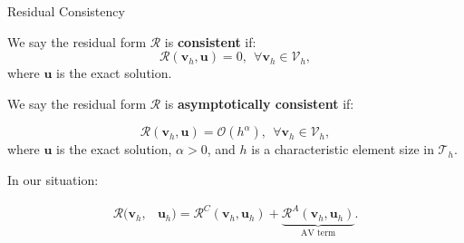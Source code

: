 \documentclass{beamer}
\newcounter{sectionframecount}
\begin{document}
\begin{frame}[t]{Residual Consistency}
\vspace{-10pt}
  \begin{itemize}
    \item We say the residual form $\mathcal{R}$ is \textbf{consistent} if:
    \begin{equation}
      \mathcal{R}(\boldsymbol{v}_h,\boldsymbol{u}) = 0,~~\forall \boldsymbol{v}_h \in \mathcal{V}_h,
    \end{equation}
    where $\boldsymbol{u}$ is the exact solution.

    {
    \item We say the residual form $\mathcal{R}$ is \textbf{asymptotically consistent} if:

    \begin{equation}
      \mathcal{R}(\boldsymbol{v}_h,\boldsymbol{u}) = \mathcal{O}(h^\alpha),~~\forall \boldsymbol{v}_h \in \mathcal{V}_h,
      \label{e:asymptotic_consistent}
    \end{equation}
    where $\boldsymbol{u}$ is the exact solution, $\alpha>0$, and $h$ is a characteristic element size in $\mathcal{T}_h$.
    }
  \end{itemize}

{
\vspace{10pt}
In our situation:

\begin{equation}
  \begin{split}
  \mathcal{R}(\boldsymbol{v}_h,&\boldsymbol{u}_h) =
  \mathcal{R}^C(\boldsymbol{v}_h,\boldsymbol{u}_h) + \underbrace{\mathcal{R}^A(\boldsymbol{v}_h,\boldsymbol{u}_h)}_{\text{AV term}}.
  \end{split}
  \label{e:residual_C_A_decomposition}
\end{equation}
}

\end{frame}

\end{document}
